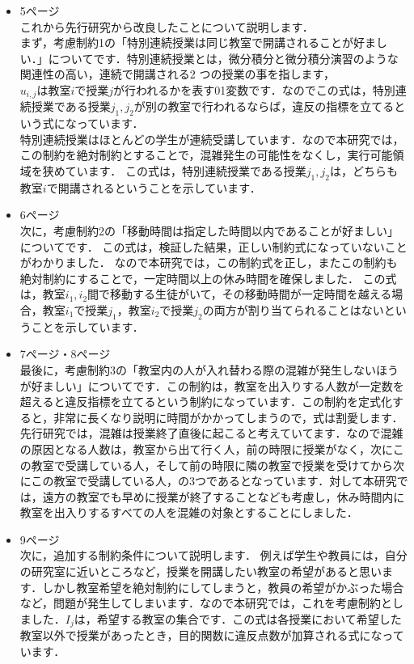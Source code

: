 \documentclass{jsarticle}
\begin{document}
\begin{itemize}
\item 5ページ\\
これから先行研究から改良したことについて説明します．\\
まず，考慮制約1の「特別連続授業は同じ教室で開講されることが好ましい．」についてです．特別連続授業とは，微分積分と微分積分演習のような関連性の高い，連続で開講される2 つの授業の事を指します，\\
$u_{i,j}$は教室$i$で授業$j$が行われるかを表す01変数です．なのでこの式は，特別連続授業である授業$j_1,j_2$が別の教室で行われるならば，違反の指標を立てるという式になっています．\\
特別連続授業はほとんどの学生が連続受講しています．なので本研究では，この制約を絶対制約とすることで，混雑発生の可能性をなくし，実行可能領域を狭めています．
この式は，特別連続授業である授業$j_1,j_2$は，どちらも教室$i$で開講されるということを示しています．\\

\item 6ページ\\
次に，考慮制約2の「移動時間は指定した時間以内であることが好ましい」についてです．
この式は，検証した結果，正しい制約式になっていないことがわかりました．
なので本研究では，この制約式を正し，またこの制約も絶対制約にすることで，一定時間以上の休み時間を確保しました．
この式は，教室$i_1,i_2 $間で移動する生徒がいて，その移動時間が一定時間を越える場合，教室$i_1$で授業$j_1$，教室$i_2$で授業$j_2$の両方が割り当てられることはないということを示しています．\\

\item 7ページ・8ページ\\
最後に，考慮制約3の「教室内の人が入れ替わる際の混雑が発生しないほうが好ましい」についてです．この制約は，教室を出入りする人数が一定数を超えると違反指標を立てるという制約になっています．この制約を定式化すると，非常に長くなり説明に時間がかかってしまうので，式は割愛します．\\
先行研究では，混雑は授業終了直後に起こると考えていてます．なので混雑の原因となる人数は，教室から出て行く人，前の時限に授業がなく，次にこの教室で受講している人，そして前の時限に隣の教室で授業を受けてから次にこの教室で受講している人，の3つであるとなっています．対して本研究では，遠方の教室でも早めに授業が終了することなども考慮し，休み時間内に教室を出入りするすべての人を混雑の対象とすることにしました．\\

\item 9ページ\\
次に，追加する制約条件について説明します．
例えば学生や教員には，自分の研究室に近いところなど，授業を開講したい教室の希望があると思います．しかし教室希望を絶対制約にしてしまうと，教員の希望がかぶった場合など，問題が発生してしまいます．なので本研究では，これを考慮制約としました．$I_j$は，希望する教室の集合です．この式は各授業において希望した教室以外で授業があったとき，目的関数に違反点数が加算される式になっています．\\


\end{itemize}
\end{document}
